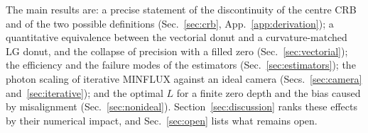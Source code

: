 The main results are: a precise statement of the discontinuity of the centre CRB and of the two
possible definitions (Sec.~\ref{sec:crb}, App.~\ref{app:derivation}); a quantitative equivalence
between the vectorial donut and a curvature-matched LG donut, and the collapse of precision with
a filled zero (Sec.~\ref{sec:vectorial}); the efficiency and the failure modes of the estimators
(Sec.~\ref{sec:estimators}); the photon scaling of iterative MINFLUX against an ideal camera
(Secs.~\ref{sec:camera} and~\ref{sec:iterative}); and the optimal $L$ for a finite zero depth
and the bias caused by misalignment (Sec.~\ref{sec:nonideal}). Section~\ref{sec:discussion}
ranks these effects by their numerical impact, and Sec.~\ref{sec:open} lists what remains open.

